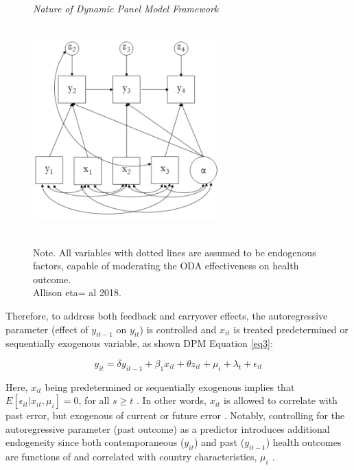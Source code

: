 \begin{figure}[ht]
\captionsetup{justification=justified,singlelinecheck=false}
\caption{\textit{Nature of Dynamic Panel Model Framework}}
    \centering \includegraphics[width = 0.65\textwidth, height = 8cm]{Figures/Methodology/Sequential Ignorability.png}
    \label{fig:SeqIgnor}
    \caption*{\footnotesize{Note. All variables with dotted lines are assumed to be endogenous factors, capable of moderating the ODA effectiveness on health outcome.\\ Allison eta= al 2018.}}
\end{figure}

Therefore, to address both feedback and carryover effects, the autoregressive parameter (effect of $y_{it-1}$ on $y_{it}$) is controlled and  $x_{it}$ is treated predetermined or sequentially exogenous variable, as shown DPM Equation \ref{eq3}:



\begin{equation}
    y_{it} = \delta y_{it-1} + \beta_{1} x_{it} + \theta z_{it} + \mu_i + \lambda_t + \epsilon_{it}
    \label{eq3}
\end{equation}

Here, $x_{it}$ being predetermined or sequentially exogenous implies that  $E[\epsilon_{it}|x_{it}, \mu_i] = 0$, for all $s \geq t$ \parencite{allison2017maximum}. In other words, $x_{it}$ is allowed to correlate with past error, but exogenous of current or future error \parencite{seddig2020maximum}. Notably, controlling for the autoregressive parameter (past outcome) as a predictor introduces additional endogeneity since both contemporaneous ($y_{it}$) and past ($y_{it-1}$) health outcomes are functions of and correlated with country characteristics, $\mu_i$ \parencite{shafa_assessment_2023, yogo_health_2015, nwude_official_2020}.

